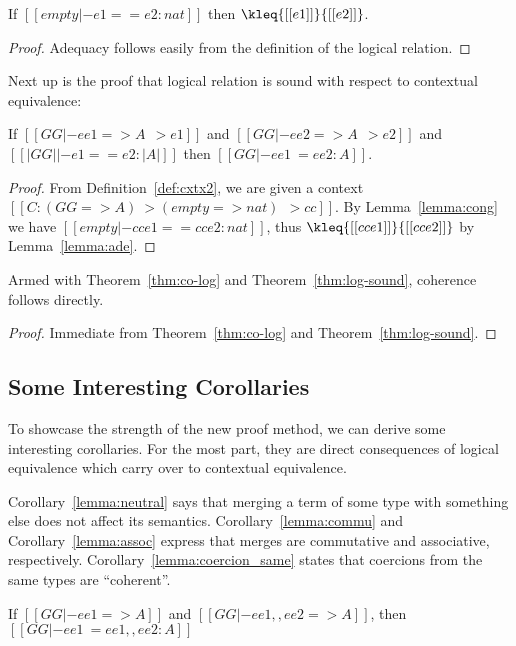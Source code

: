 \begin{lemma}[Adequacy] \label{lemma:ade}
  If $[[  empty |- e1 == e2 : nat ]]$ then $\kleq{[[e1]]}{[[e2]]}$.
\end{lemma}
\begin{proof}
  Adequacy follows easily from the definition of the logical relation.
\end{proof}


Next up is the proof that logical relation is sound with respect to contextual equivalence:
\begin{theorem} \label{thm:log-sound}
  If $[[ GG |- ee1 => A ~~> e1]]$ and $[[ GG |- ee2 => A ~~> e2]]$ and $  [[|GG| |- e1 == e2 : |A|]]  $ then
  $[[   GG |- ee1 ~= ee2 : A ]]$.
\end{theorem}
\begin{proof}
  From Definition~\ref{def:cxtx2}, we are given a context $[[  C : (GG => A) ~> (empty => nat) ~~> cc ]]$. By Lemma~\ref{lemma:cong}
  we have $[[  empty |- cc{e1} == cc{e2} : nat  ]]$, thus $  \kleq{[[ cc{e1} ]]}{ [[cc{e2} ]]}    $ by Lemma~\ref{lemma:ade}.
\end{proof}


Armed with Theorem~\ref{thm:co-log} and Theorem~\ref{thm:log-sound}, coherence follows directly.
\coherence*
\begin{proof}
  Immediate from Theorem~\ref{thm:co-log} and Theorem~\ref{thm:log-sound}.
\end{proof}

\subsection{Some Interesting Corollaries}

To showcase the strength of the new proof method, we can derive some
interesting corollaries. For the most part, they are direct consequences of
logical equivalence which carry over to contextual equivalence.


Corollary~\ref{lemma:neutral} says that merging a term of some type with something else
does not affect its semantics. Corollary~\ref{lemma:commu} and Corollary~\ref{lemma:assoc} express that
merges are commutative and associative, respectively. Corollary~\ref{lemma:coercion_same}
states that coercions from the same types are ``coherent''.

\begin{corollary} \label{lemma:neutral}
  If $[[GG |- ee1 => A ]]$ and $[[GG |- ee1 ,, ee2 => A ]]$, then
  $[[GG |- ee1 ~= ee1 ,, ee2 : A]]$
\end{corollary}

